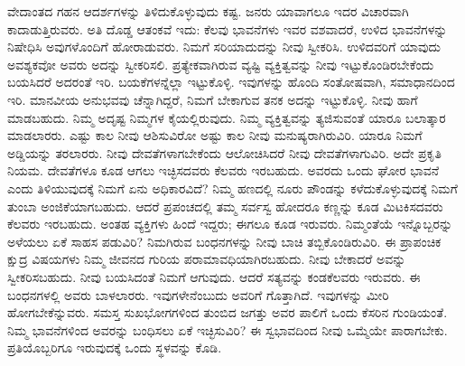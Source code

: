 \vskip 5pt

ವೇದಾಂತದ ಗಹನ ಆದರ್ಶಗಳನ್ನು ತಿಳಿದುಕೊಳ್ಳುವುದು ಕಷ್ಟ. ಜನರು ಯಾವಾಗಲೂ ಇದರ ವಿಚಾರವಾಗಿ ಕಾದಾಡುತ್ತಿರುವರು. ಅತಿ ದೊಡ್ಡ ಆತಂಕವೆ ಇದು: ಕೆಲವು ಭಾವನೆಗಳು ಇವರ ವಶವಾದರೆ, ಉಳಿದ ಭಾವನೆಗಳನ್ನು ನಿಷೇಧಿಸಿ ಅವುಗಳೊಂದಿಗೆ ಹೋರಾಡುವರು. ನಿಮಗೆ ಸರಿಯಾದುದನ್ನು ನೀವು ಸ್ವೀಕರಿಸಿ. ಉಳಿದವರಿಗೆ ಯಾವುದು ಅವಶ್ಯಕವೋ ಅವರು ಅದನ್ನು ಸ್ವೀಕರಿಸಲಿ. ಪ್ರತ್ಯೇಕವಾಗಿರುವ ವ್ಯಷ್ಟಿ ವ್ಯಕ್ತಿತ್ವವನ್ನು ನೀವು ಇಟ್ಟುಕೊಂಡಿರಬೇಕೆಂದು ಬಯಸಿದರೆ ಅದರಂತೆ ಇರಿ. ಬಯಕೆಗಳನ್ನೆಲ್ಲಾ ಇಟ್ಟುಕೊಳ್ಳಿ. ಇವುಗಳನ್ನು ಹೊಂದಿ ಸಂತೋಷವಾಗಿ, ಸಮಾಧಾನದಿಂದ ಇರಿ. ಮಾನವೀಯ ಅನುಭವವು ಚೆನ್ನಾಗಿದ್ದರೆ, ನಿಮಗೆ ಬೇಕಾಗುವ ತನಕ ಅದನ್ನು ಇಟ್ಟುಕೊಳ್ಳಿ. ನೀವು ಹಾಗೆ ಮಾಡಬಹುದು. ನಿಮ್ಮ ಅದೃಷ್ಟ ನಿಮ್ಮಗಳ ಕೈಯಲ್ಲಿರುವುದು. ನಿಮ್ಮ ವ್ಯಕ್ತಿತ್ವವನ್ನು ತ್ಯಜಿಸುವಂತೆ ಯಾರೂ ಬಲಾತ್ಕಾರ ಮಾಡಲಾರರು. ಎಷ್ಟು ಕಾಲ ನೀವು ಆಶಿಸುವಿರೋ ಅಷ್ಟು ಕಾಲ ನೀವು ಮನುಷ್ಯರಾಗಿರುವಿರಿ. ಯಾರೂ ನಿಮಗೆ ಅಡ್ಡಿಯನ್ನು ತರಲಾರರು. ನೀವು ದೇವತೆಗಳಾಗಬೇಕೆಂದು ಆಲೋಚಿಸಿದರೆ ನೀವು ದೇವತೆಗಳಾಗುವಿರಿ. ಅದೇ ಪ್ರಕೃತಿ ನಿಯಮ. ದೇವತೆಗಳೂ ಕೂಡ ಆಗಲು ಇಚ್ಛಿಸದವರು ಕೆಲವರು ಇರಬಹುದು. ಅವರದು ಒಂದು ಘೋರ ಭಾವನೆ ಎಂದು ತಿಳಿಯುವುದಕ್ಕೆ ನಿಮಗೆ ಏನು ಅಧಿಕಾರವಿದೆ? ನಿಮ್ಮ ಹಣದಲ್ಲಿ ನೂರು ಪೌಂಡನ್ನು ಕಳೆದುಕೊಳ್ಳುವುದಕ್ಕೆ ನಿಮಗೆ ತುಂಬಾ ಅಂಜಿಕೆಯಾಗಬಹುದು. ಆದರೆ ಪ್ರಪಂಚದಲ್ಲಿ ತಮ್ಮ ಸರ್ವಸ್ವ ಹೋದರೂ ಕಣ್ಣನ್ನು ಕೂಡ ಮಿಟಕಿಸದವರು ಕೆಲವರು ಇರಬಹುದು. ಅಂತಹ ವ್ಯಕ್ತಿಗಳು ಹಿಂದೆ ಇದ್ದರು; ಈಗಲೂ ಕೂಡ ಇರುವರು. ನಿಮ್ಮಂತೆಯೆ ಇನ್ನೊಬ್ಬರನ್ನು ಅಳೆಯಲು ಏಕೆ ಸಾಹಸ ಪಡುವಿರಿ? ನಿಮಗಿರುವ ಬಂಧನಗಳನ್ನು ನೀವು ಬಾಚಿ ತಬ್ಬಿಕೊಂಡಿರುವಿರಿ. ಈ ಪ್ರಾಪಂಚಿಕ ಕ್ಷುದ್ರ ವಿಷಯಗಳು ನಿಮ್ಮ ಜೀವನದ ಗುರಿಯ ಪರಾಮಾವಧಿಯಾಗಿರಬಹುದು. ನೀವು ಬೇಕಾದರೆ ಅವನ್ನು ಸ್ವೀಕರಿಸಬಹುದು. ನೀವು ಬಯಸಿದಂತೆ ನಿಮಗೆ ಆಗುವುದು. ಆದರೆ ಸತ್ಯವನ್ನು ಕಂಡ\break ಕೆಲವರು ಇರುವರು. ಈ ಬಂಧನಗಳಲ್ಲಿ ಅವರು ಬಾಳಲಾರರು. ಇವುಗಳೇನೆಂಬುದು ಅವರಿಗೆ ಗೊತ್ತಾಗಿದೆ. ಇವುಗಳನ್ನು ಮೀರಿ ಹೋಗಬೇಕೆನ್ನುವರು. ಸಮಸ್ತ ಸುಖಭೋಗಗಳಿಂದ ತುಂಬಿದ ಜಗತ್ತು ಅವರ ಪಾಲಿಗೆ ಒಂದು ಕೆಸರಿನ ಗುಂಡಿಯಂತೆ. ನಿಮ್ಮ ಭಾವನೆಗಳಿಂದ ಅವರನ್ನು ಬಂಧಿಸಲು ಏಕೆ ಇಚ್ಛಿಸುವಿರಿ? ಈ ಸ್ವಭಾವದಿಂದ ನೀವು ಒಮ್ಮೆಯೇ ಪಾರಾಗಬೇಕು. ಪ್ರತಿಯೊಬ್ಬರಿಗೂ ಇರುವುದಕ್ಕೆ ಒಂದು ಸ್ಥಳವನ್ನು ಕೊಡಿ. 

\vskip 5pt


